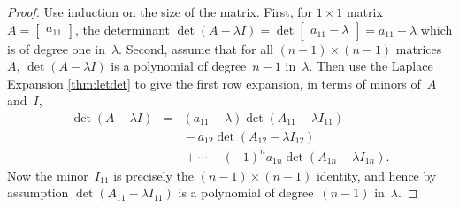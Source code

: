 \begin{proof} 
Use induction on the size of the matrix.
First, for \(1\times 1\) matrix \(A=\begin{bmatrix} a_{11} \end{bmatrix}\), the determinant \(\det(A-\lambda I)=\det \begin{bmatrix} a_{11}-\lambda \end{bmatrix}=a_{11}-\lambda\) which is of  degree one in~\(\lambda\).
Second, assume that for all \((n-1)\times (n-1)\) matrices~\(A\), \(\det(A-\lambda I)\) is a polynomial of degree~\(n-1\) in~\(\lambda\).
Then use the Laplace Expansion \autoref{thm:letdet} to give the first row expansion, in terms of minors of~\(A\) and~\(I\),
\begin{eqnarray*}
\det(A-\lambda I)
&=&(a_{11}-\lambda)\det (A_{11}-\lambda I_{11})
\\&&{}
-a_{12}\det (A_{12}-\lambda I_{12})
\\&&{}
+\cdots-(-1)^{n}a_{1n}\det (A_{1n}-\lambda I_{1n}).
\end{eqnarray*}
Now the minor~\(I_{11}\) is precisely the \((n-1)\times(n-1)\) identity, and hence by assumption \(\det(A_{11}-\lambda I_{11})\) is a polynomial of degree~\((n-1)\) in~\(\lambda\).

\end{proof}
